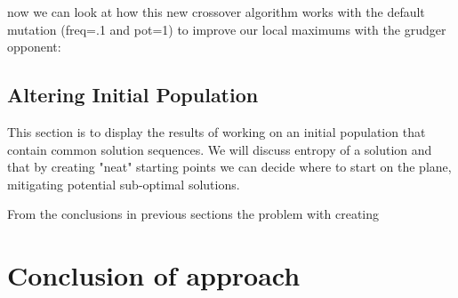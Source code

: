 now we can look at how this new crossover algorithm works with the default mutation (freq=.1 and pot=1) to improve our local maximums with the grudger opponent:\\
            

\subsection{Altering Initial Population}

This section is to display the results of working on an initial population that contain common solution sequences. We will discuss entropy of a solution and that by creating "neat" starting points we can decide where to start on the plane, mitigating potential sub-optimal solutions.

From the conclusions in previous sections the problem with creating 

\section{Conclusion of approach}